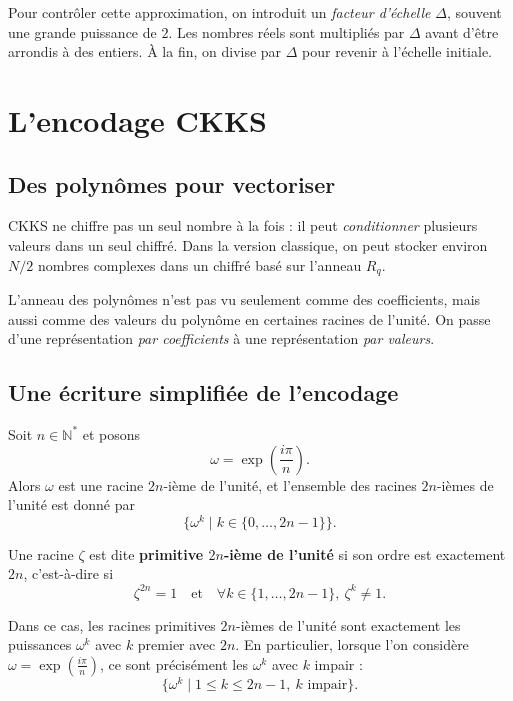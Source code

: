Pour contrôler cette approximation, on introduit un \emph{facteur d'échelle} $\Delta$, souvent une grande puissance de $2$. Les nombres réels sont multipliés par $\Delta$ avant d'être arrondis à des entiers. À la fin, on divise par $\Delta$ pour revenir à l'échelle initiale.

\section{L'encodage CKKS}

\subsection{Des polynômes pour vectoriser}

CKKS ne chiffre pas un seul nombre à la fois : il peut \emph{conditionner} plusieurs valeurs dans un seul chiffré. Dans la version classique, on peut stocker environ $N/2$ nombres complexes dans un chiffré basé sur l'anneau $R_q$.

L'anneau des polynômes n'est pas vu seulement comme des coefficients, mais aussi comme des valeurs du polynôme en certaines racines de l'unité. On passe d'une représentation \emph{par coefficients} à une représentation \emph{par valeurs}.

\subsection{Une écriture simplifiée de l'encodage}

\begin{definition}
Soit $n \in \mathbb{N}^*$ et posons
\[
\omega = \exp\left(\frac{i\pi}{n}\right).
\]
Alors $\omega$ est une racine $2n$-ième de l’unité, et l’ensemble des racines $2n$-ièmes de l’unité est donné par
\[
\{ \omega^k \mid k \in \{0,\dots,2n-1\} \}.
\]

Une racine $\zeta$ est dite \textbf{primitive $2n$-ième de l’unité} si son ordre est exactement $2n$, c’est-à-dire si
\[
\zeta^{2n} = 1 \quad \text{et} \quad \forall k \in \{1,\dots,2n-1\},\ \zeta^k \neq 1.
\]

Dans ce cas, les racines primitives $2n$-ièmes de l’unité sont exactement les puissances $\omega^k$ avec $k$ premier avec $2n$. En particulier, lorsque l’on considère $\omega = \exp\left(\frac{i\pi}{n}\right)$, ce sont précisément les $\omega^k$ avec $k$ impair :
\[
\{ \omega^k \mid 1 \leq k \leq 2n-1,\ k \text{ impair} \}.
\]
\end{definition}


